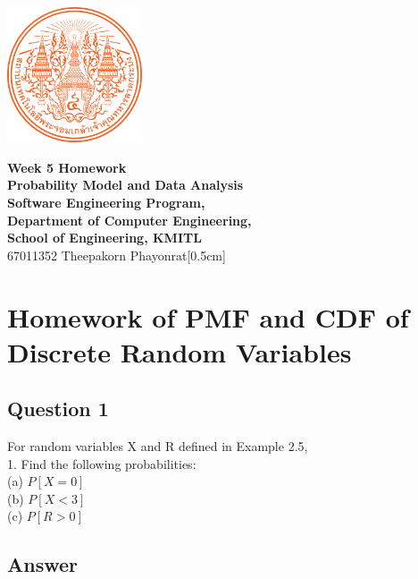 \documentclass[12pt]{report} %
\begin{document}
\begin{titlepage}
	\centering
	\vspace*{1cm} %
	\includegraphics[width=0.3\textwidth]{../images/KMITL Logo.png} %

	\vspace{1cm} %
	{\LARGE \textbf{Week 5 Homework}} \\[0.5cm] %
	\vspace{0.5cm}
	{\large \textbf{Probability Model and Data Analysis}} \\[0.5cm]
    {\large \textbf{Software Engineering Program,}} \\[0.5cm]
	{\large \textbf{Department of Computer Engineering,}} \\[0.5cm]
	{\large \textbf{School of Engineering, KMITL}} \\[1cm]
	{\Large 67011352 Theepakorn Phayonrat}[0.5cm] %
\end{titlepage}

\section*{Homework of PMF and CDF of Discrete Random Variables}

\subsection*{Question 1}

\noindent For random variables X and R defined in Example 2.5, \\
1. Find the following probabilities: \\
\noindent (a) $P[X = 0]$ \\
(b) $P[X < 3]$ \\
(c) $P[R > 0]$ \\

\subsection*{Answer}
\end{document}
